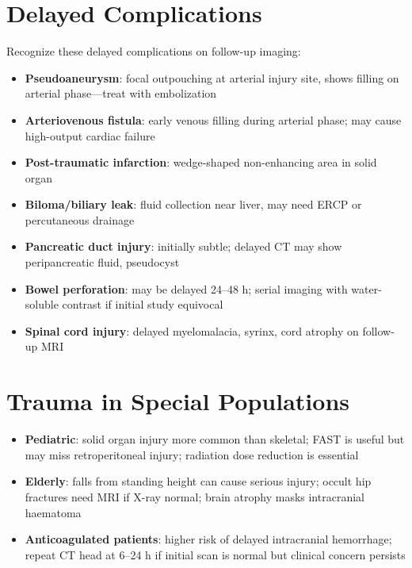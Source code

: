 \section{Delayed Complications}
Recognize these delayed complications on follow-up imaging:

\begin{itemize}
  \item \textbf{Pseudoaneurysm}: focal outpouching at arterial injury site, shows filling on arterial phase---treat with embolization
  \item \textbf{Arteriovenous fistula}: early venous filling during arterial phase; may cause high-output cardiac failure
  \item \textbf{Post-traumatic infarction}: wedge-shaped non-enhancing area in solid organ
  \item \textbf{Biloma/biliary leak}: fluid collection near liver, may need ERCP or percutaneous drainage
  \item \textbf{Pancreatic duct injury}: initially subtle; delayed CT may show peripancreatic fluid, pseudocyst
  \item \textbf{Bowel perforation}: may be delayed 24--48 h; serial imaging with water-soluble contrast if initial study equivocal
  \item \textbf{Spinal cord injury}: delayed myelomalacia, syrinx, cord atrophy on follow-up MRI
\end{itemize}

\section{Trauma in Special Populations}
\begin{itemize}
  \item \textbf{Pediatric}: solid organ injury more common than skeletal; FAST is useful but may miss retroperitoneal injury; radiation dose reduction is essential
  \item \textbf{Elderly}: falls from standing height can cause serious injury; occult hip fractures need MRI if X-ray normal; brain atrophy masks intracranial haematoma
  \item \textbf{Anticoagulated patients}: higher risk of delayed intracranial hemorrhage; repeat CT head at 6--24 h if initial scan is normal but clinical concern persists
\end{itemize}

